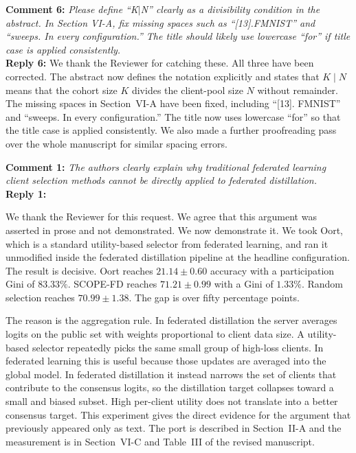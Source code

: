 \documentclass[10pt]{article}
\begin{document}
\noindent
\textbf{Comment 6:} \textit{Please define ``K$|$N'' clearly as a divisibility condition in the abstract. In Section VI-A, fix missing spaces such as ``[13].FMNIST'' and ``sweeps. In every configuration.'' The title should likely use lowercase ``for'' if title case is applied consistently.} \\
\noindent
\textbf{Reply 6:} {We thank the Reviewer for catching these. All three have been corrected. The abstract now defines the notation explicitly and states that $K \mid N$ means that the cohort size $K$ divides the client-pool size $N$ without remainder. The missing spaces in Section~VI-A have been fixed, including ``[13]. FMNIST'' and ``sweeps. In every configuration.'' The title now uses lowercase ``for'' so that the title case is applied consistently. We also made a further proofreading pass over the whole manuscript for similar spacing errors.}\\


\noindent
\textbf{Comment 1:} \textit{The authors clearly explain why traditional federated learning client selection methods cannot be directly applied to federated distillation.} \\
\noindent
\textbf{Reply 1:} {We thank the Reviewer for this request. We agree that this argument was asserted in prose and not demonstrated. We now demonstrate it. We took Oort, which is a standard utility-based selector from federated learning, and ran it unmodified inside the federated distillation pipeline at the headline configuration. The result is decisive. Oort reaches $21.14 \pm 0.60$ accuracy with a participation Gini of $83.33\%$. SCOPE-FD reaches $71.21 \pm 0.99$ with a Gini of $1.33\%$. Random selection reaches $70.99 \pm 1.38$. The gap is over fifty percentage points.

The reason is the aggregation rule. In federated distillation the server averages logits on the public set with weights proportional to client data size. A utility-based selector repeatedly picks the same small group of high-loss clients. In federated learning this is useful because those updates are averaged into the global model. In federated distillation it instead narrows the set of clients that contribute to the consensus logits, so the distillation target collapses toward a small and biased subset. High per-client utility does not translate into a better consensus target. This experiment gives the direct evidence for the argument that previously appeared only as text. The port is described in Section~II-A and the measurement is in Section~VI-C and Table~III of the revised manuscript.}\\
\end{document}
